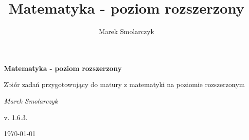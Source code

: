 \documentclass[a4paper,12pt]{book}
\begin{document}
\frontmatter

\begin{titlepage}
	\centering
	{ \bfseries \LARGE Matematyka - poziom rozszerzony \par }
	\vspace{1cm}
	{ \large Zbiór zadań przygotowujący do matury z matematyki na poziomie rozszerzonym \par }
	\vspace{3cm}
	{ \itshape \large Marek Smolarczyk \par }
	\vfill
	{ \large v. 1.6.3. \par }
	\vspace{0.2cm}
	{ \large \today \par }
\end{titlepage}

\author{Marek Smolarczyk}
\title{Matematyka - poziom rozszerzony}

\tableofcontents


\mainmatter



\backmatter
\end{document}
